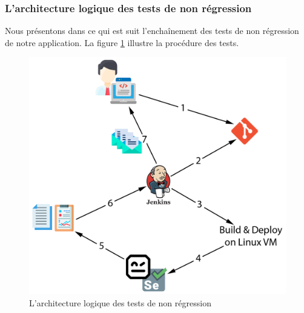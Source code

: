 \subsubsection{L'architecture logique des tests de non régression}
Nous présentons dans ce qui est suit l'enchaînement des tests de non régression de notre application. La figure \ref{fig:jenkins-schema} illustre la procédure des tests.
\begin{figure}[H]
	\centering
	\includegraphics[width=0.5\linewidth]{img/jenkins}
	\caption[L'architecture logique des tests de non régression]{L'architecture logique des tests de non régression}
	\label{fig:jenkins-schema}
\end{figure}
